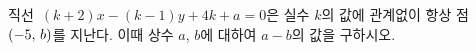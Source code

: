직선~$(k+2)x-(k-1)y+4k+a=0$은 실수 $k$의 값에 관계없이 항상 점~$(-5,\mkern3mu b)$를 지난다. 이때 상수 $a$, $b$에 대하여 $a-b$의 값을 구하시오.
